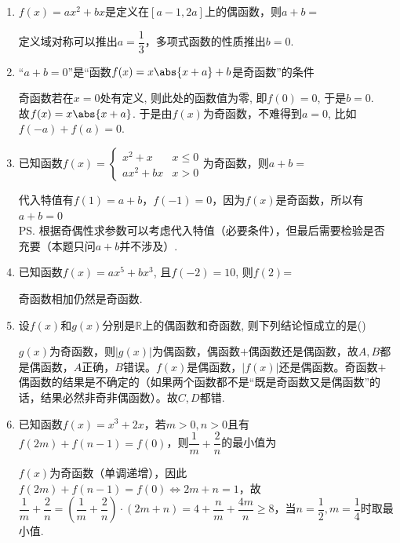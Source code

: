\begin{enumerate}
    \item $f(x) = ax^2+bx$是定义在$[a-1, 2a]$上的偶函数，则$a+b = $
    \begin{jieda}
        定义域对称可以推出$a = \dfrac{1}{3}$，多项式函数的性质推出$b = 0$.
    \end{jieda}
    \item “$a+b=0$”是“函数$f(x)=x\abs{x+a}+b$是奇函数”的条件
    \begin{jieda}
    奇函数若在$x=0$处有定义, 则此处的函数值为零, 即$f(0)=0$, 于是$b=0$. \\
    故$f(x)=x\abs{x+a}$. 于是由$f(x)$为奇函数，不难得到$a=0$, 比如$f(-a)+f(a)=0$. 
    \end{jieda}
    \item 已知函数$f(x) = \left \{ \begin{array}{ll}
        x^2 + x & x \leq 0 \\
        ax^2 + bx & x > 0
    \end{array}\right.$为奇函数，则$a+b = $
    \begin{jieda}
        代入特值有$f(1) = a+b$，$f(-1) = 0$，因为$f(x)$是奇函数，所以有$a+b = 0$ \\
        \ps 根据奇偶性求参数可以考虑代入特值（必要条件），但最后需要检验是否充要（本题只问$a+b$并不涉及）.
    \end{jieda}
    \item 已知函数$f(x)=ax^5+bx^3$, 且$f(-2)=10$, 则$f(2)$=
    \begin{jieda}
        奇函数相加仍然是奇函数.
    \end{jieda}
    \item 设$f(x)$和$g(x)$分别是$\mathbb{R}$上的偶函数和奇函数, 则下列结论恒成立的是\dotfill()
    \begin{jieda}
    $g(x)$为奇函数，则$|g(x)|$为偶函数，偶函数$+$偶函数还是偶函数，故$A, B$都是偶函数，$A$正确，$B$错误。$f(x)$是偶函数，$|f(x)|$还是偶函数。奇函数$+$偶函数的结果是不确定的（如果两个函数都不是“既是奇函数又是偶函数”的话，结果必然非奇非偶函数）。故$C,D$都错.
    \end{jieda}
    \item 已知函数$f(x) = x^3+2x$，若$m > 0, n>0$且有$f(2m)+f(n-1) = f(0)$，则$\dfrac{1}{m}+\dfrac{2}{n}$的最小值为
    \begin{jieda}
        $f(x)$为奇函数（单调递增），因此$f(2m)+f(n-1) = f(0) \Longleftrightarrow 2m+n=1$，故$\dfrac{1}{m}+\dfrac{2}{n} = \left(\dfrac{1}{m}+\dfrac{2}{n}\right) \cdot (2m+n) = 4+\dfrac{n}{m}+\dfrac{4m}{n} \geq 8$，当$n = \dfrac{1}{2}, m = \dfrac{1}{4}$时取最小值.
    \end{jieda}
\end{enumerate}


